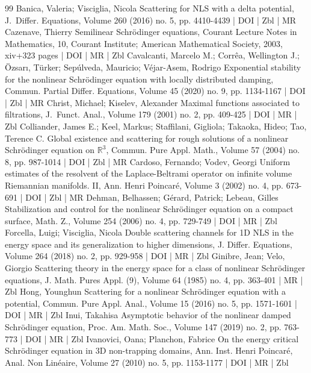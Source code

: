 \documentclass[10pt]{amsart}
\theoremstyle{definition}\newtheorem{defi}[theo]{Definition}\newtheorem{rema}[theo]{Remark}\newtheorem{exam}[theo]{Example}\newtheorem{exem}[theo]{Example}\newtheorem{nota}[theo]{Notation}
\begin{document}
\begin{thebibliography}{99}
Banica, Valeria; Visciglia, Nicola Scattering for NLS with a delta potential, J. Differ. Equations, Volume 260 (2016) no. 5, pp. 4410-4439 | DOI | Zbl | MR
Cazenave, Thierry Semilinear Schrödinger equations, Courant Lecture Notes in Mathematics, 10, Courant Institute; American Mathematical Society, 2003, xiv+323 pages | DOI | MR | Zbl
Cavalcanti, Marcelo M.; Corrêa, Wellington J.; Özsarı, Türker; Sepúlveda, Mauricio; Véjar-Asem, Rodrigo Exponential stability for the nonlinear Schrödinger equation with locally distributed damping, Commun. Partial Differ. Equations, Volume 45 (2020) no. 9, pp. 1134-1167 | DOI | Zbl | MR
Christ, Michael; Kiselev, Alexander Maximal functions associated to filtrations, J. Funct. Anal., Volume 179 (2001) no. 2, pp. 409-425 | DOI | MR | Zbl
Colliander, James E.; Keel, Markus; Staffilani, Gigliola; Takaoka, Hideo; Tao, Terence C. Global existence and scattering for rough solutions of a nonlinear Schrödinger equation on $\mathbb{R}^3$, Commun. Pure Appl. Math., Volume 57 (2004) no. 8, pp. 987-1014 | DOI | Zbl | MR
Cardoso, Fernando; Vodev, Georgi Uniform estimates of the resolvent of the Laplace-Beltrami operator on infinite volume Riemannian manifolds. II, Ann. Henri Poincaré, Volume 3 (2002) no. 4, pp. 673-691 | DOI | Zbl | MR
Dehman, Belhassen; Gérard, Patrick; Lebeau, Gilles Stabilization and control for the nonlinear Schrödinger equation on a compact surface, Math. Z., Volume 254 (2006) no. 4, pp. 729-749 | DOI | MR | Zbl
Forcella, Luigi; Visciglia, Nicola Double scattering channels for 1D NLS in the energy space and its generalization to higher dimensions, J. Differ. Equations, Volume 264 (2018) no. 2, pp. 929-958 | DOI | MR | Zbl
Ginibre, Jean; Velo, Giorgio Scattering theory in the energy space for a class of nonlinear Schrödinger equations, J. Math. Pures Appl. (9), Volume 64 (1985) no. 4, pp. 363-401 | MR | Zbl
Hong, Younghun Scattering for a nonlinear Schrödinger equation with a potential, Commun. Pure Appl. Anal., Volume 15 (2016) no. 5, pp. 1571-1601 | DOI | MR | Zbl
Inui, Takahisa Asymptotic behavior of the nonlinear damped Schrödinger equation, Proc. Am. Math. Soc., Volume 147 (2019) no. 2, pp. 763-773 | DOI | MR | Zbl
Ivanovici, Oana; Planchon, Fabrice On the energy critical Schrödinger equation in $3\mathrm{D}$ non-trapping domains, Ann. Inst. Henri Poincaré, Anal. Non Linéaire, Volume 27 (2010) no. 5, pp. 1153-1177 | DOI | MR | Zbl

\end{thebibliography}
\end{document}
